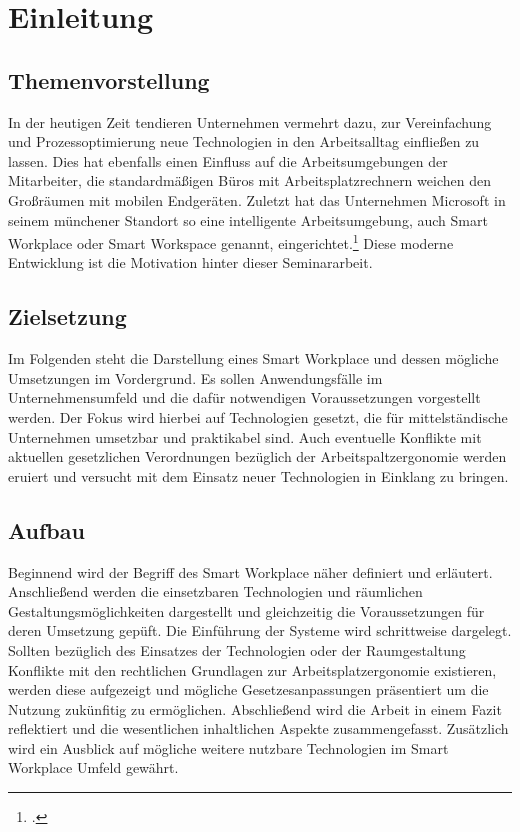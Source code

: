 \section{Einleitung}
\subsection{Themenvorstellung}
In der heutigen Zeit tendieren Unternehmen vermehrt dazu, zur Vereinfachung und Prozessoptimierung neue Technologien in den Arbeitsalltag einfließen zu lassen. Dies hat ebenfalls einen Einfluss auf die Arbeitsumgebungen der Mitarbeiter, die standardmäßigen Büros mit Arbeitsplatzrechnern weichen den Großräumen mit mobilen Endgeräten. Zuletzt hat das Unternehmen Microsoft in seinem münchener Standort so eine intelligente Arbeitsumgebung, auch Smart Workplace oder Smart Workspace genannt, eingerichtet.\footcite[Vgl.][]{MicrosoftArtikel} Diese moderne Entwicklung ist die Motivation hinter dieser Seminararbeit.

\subsection{Zielsetzung}
Im Folgenden steht die Darstellung eines Smart Workplace und dessen mögliche Umsetzungen im Vordergrund. Es sollen Anwendungsfälle im Unternehmensumfeld und die dafür notwendigen Voraussetzungen vorgestellt werden. Der Fokus wird hierbei auf Technologien gesetzt, die für mittelständische Unternehmen umsetzbar und praktikabel sind. Auch eventuelle Konflikte mit aktuellen gesetzlichen Verordnungen bezüglich der Arbeitspaltzergonomie werden eruiert und versucht mit dem Einsatz neuer Technologien in Einklang zu bringen.

\subsection{Aufbau}
Beginnend wird der Begriff des Smart Workplace näher definiert und erläutert. Anschließend werden die einsetzbaren Technologien und räumlichen Gestaltungsmöglichkeiten dargestellt und gleichzeitig die Voraussetzungen für deren Umsetzung gepüft. Die Einführung der Systeme wird schrittweise dargelegt. Sollten bezüglich des Einsatzes der Technologien oder der Raumgestaltung Konflikte mit den rechtlichen Grundlagen zur Arbeitsplatzergonomie existieren, werden diese aufgezeigt und mögliche Gesetzesanpassungen präsentiert um die Nutzung zukünfitig zu ermöglichen. Abschließend wird die Arbeit in einem Fazit reflektiert und die wesentlichen inhaltlichen Aspekte zusammengefasst. Zusätzlich wird ein Ausblick auf mögliche weitere nutzbare Technologien im Smart Workplace Umfeld gewährt.